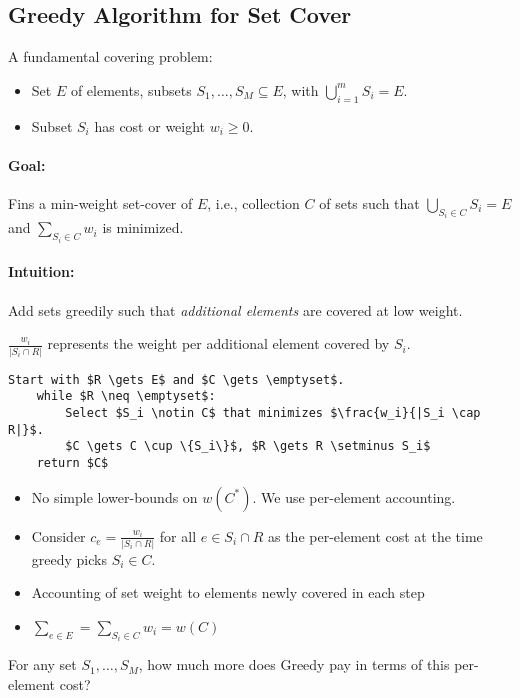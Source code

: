 \subsection{Greedy Algorithm for Set Cover}

A fundamental covering problem:
\begin{itemize}
\item Set $E$ of elements, subsets $S_1, \ldots, S_M \subseteq E$, with $\bigcup\limits_{i=1}^{m} S_i = E$.
\item Subset $S_i$ has cost or weight $w_i \ge 0$.
\end{itemize}

\paragraph{Goal:} Fins a min-weight set-cover of $E$, i.e., collection $C$ of sets such that $\bigcup\limits_{S_i \in C} S_i = E$ and $\sum\limits_{S_i \in C}w_i$ is minimized.

\paragraph{Intuition:} Add sets greedily such that \emph{additional elements} are covered at low weight.

$\frac{w_i}{|S_i \cap R|}$ represents the weight per additional element covered by $S_i$.

\begin{lstlisting}[mathescape]
    Start with $R \gets E$ and $C \gets \emptyset$.
    while $R \neq \emptyset$:
        Select $S_i \notin C$ that minimizes $\frac{w_i}{|S_i \cap R|}$.
        $C \gets C \cup \{S_i\}$, $R \gets R \setminus S_i$
    return $C$
\end{lstlisting}

\begin{itemize}
\item No simple lower-bounds on $w(C^*)$. We use per-element accounting.
\item Consider $c_e = \frac{w_i}{|S_i \cap R|}$ for all $e \in S_i \cap R$ as the per-element cost at the time greedy picks $S_i \in C$.
\item Accounting of set weight to elements newly covered in each step
\item $\sum_{e \in E} = \sum_{S_i \in C} w_i = w(C)$
\end{itemize}

For any set $S_1, \ldots, S_M$, how much more does Greedy pay in terms of this per-element cost?

